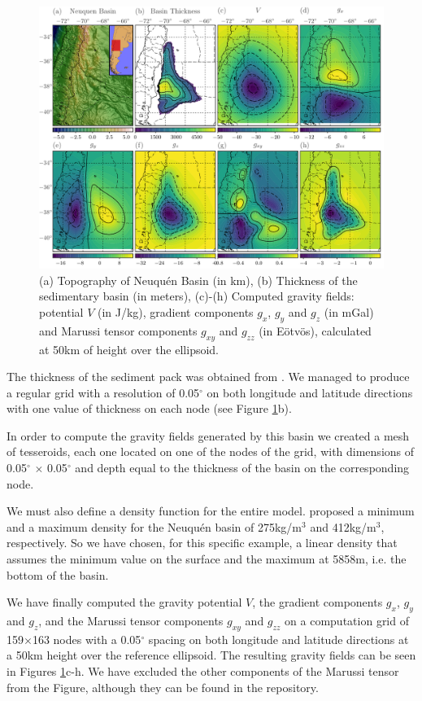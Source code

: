\documentclass[extra]{gji}
\begin{document}
\begin{figure}
\centering
\includegraphics[width=\linewidth]{figures/neuquen-basin.pdf}
\caption{(a) Topography of Neuqu\'en Basin (in km),
         (b) Thickness of the sedimentary basin (in meters),
         (c)-(h) Computed gravity fields: potential $V$ (in J/kg), gradient components $g_x$, $g_y$ and $g_z$ (in mGal) and Marussi tensor components $g_{xy}$ and $g_{zz}$ (in Eötvös), calculated at 50km of height over the ellipsoid.}
\label{fig:neuquen-basin}
\end{figure}

The thickness of the sediment pack was obtained from \citet{Heine2007}.
We managed to produce a regular grid with a resolution of 0.05$^\circ$ on both longitude and latitude directions with one value of thickness on each node (see Figure \ref{fig:neuquen-basin}b).

In order to compute the gravity fields generated by this basin we created a mesh of tesseroids, each one located on one of the nodes of the grid, with dimensions of 0.05$^\circ$ $\times$ 0.05$^\circ$ and depth equal to the thickness of the basin on the corresponding node.

We must also define a density function for the entire model.
\citet{Sigismondi2012} proposed a minimum and a maximum density for the Neuqu\'en basin of 275kg/m$^3$ and 412kg/m$^3$, respectively.
So we have chosen, for this specific example, a linear density that assumes the minimum value on the surface and the maximum at 5858m, i.e. the bottom of the basin.

We have finally computed the gravity potential $V$, the gradient components $g_x$, $g_y$ and $g_z$, and the Marussi tensor components $g_{xy}$ and $g_{zz}$ on a computation grid of 159$\times$163 nodes with a 0.05$^\circ$ spacing on both longitude and latitude directions at a 50km height over the reference ellipsoid.
The resulting gravity fields can be seen in Figures \ref{fig:neuquen-basin}c-h.
We have excluded the other components of the Marussi tensor from the Figure, although they can be found in the repository.
\end{document}
